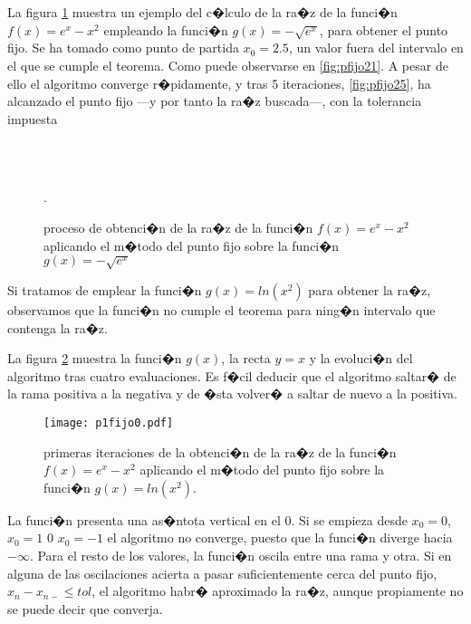 La figura \ref{fig:pfijo2} muestra un ejemplo del c�lculo de la ra�z de la funci�n $f(x)=e^x-x^2$ empleando la funci�n $g(x)=-\sqrt{e^x}$, para obtener el punto fijo. Se ha tomado como punto de partida $x_0=2.5$, un valor fuera del intervalo en el que se cumple el teorema. Como puede observarse en \ref{fig:pfijo21}. A pesar de ello el algoritmo converge r�pidamente, y tras 5 iteraciones, \ref{fig:pfijo25}, ha alcanzado el punto fijo ---y por tanto la ra�z buscada---, con la tolerancia impuesta
  
\begin{figure}
\centering
{} \qquad
{}\\
\qquad
{}\\
\qquad
{}
\caption{proceso de obtenci�n de la ra�z de la funci�n $f(x)=e^x-x^2$ aplicando el m�todo del punto fijo sobre la funci�n $g(x)=-\sqrt{e^x}$}.
\label{fig:pfijo2}
\end{figure}

Si tratamos de emplear la funci�n $g(x)=ln(x^2)$ para obtener la ra�z, observamos que la funci�n no cumple el teorema para ning�n intervalo que contenga la ra�z. 

La figura \ref{fig:pfijo03} muestra la funci�n $g(x)$, la recta $y=x$ y la evoluci�n del algoritmo tras cuatro evaluaciones. Es f�cil deducir que el algoritmo saltar� de la rama positiva a la negativa y de �sta volver� a saltar de nuevo a la positiva. 

\begin{figure}[h]
\texttt{[image: p1fijo0.pdf]}
\caption{primeras iteraciones de la obtenci�n de la ra�z de la funci�n $f(x)=e^x-x^2$ aplicando el m�todo del punto fijo sobre la funci�n $g(x)=ln(x^2)$.}
\label{fig:pfijo03}
\end{figure}

La funci�n presenta una as�ntota vertical en el $0$. Si se empieza desde $x_0=0$, $x_0=1$ 0 $x_0=-1$ el algoritmo no converge, puesto que la funci�n diverge hacia $-\infty$. Para el resto de los valores, la funci�n oscila entre una rama y otra. Si en alguna de las oscilaciones acierta a pasar suficientemente cerca del punto fijo, $x_n-x_{n-} \leq tol$, el algoritmo habr� aproximado la ra�z, aunque propiamente no se puede decir que converja.

